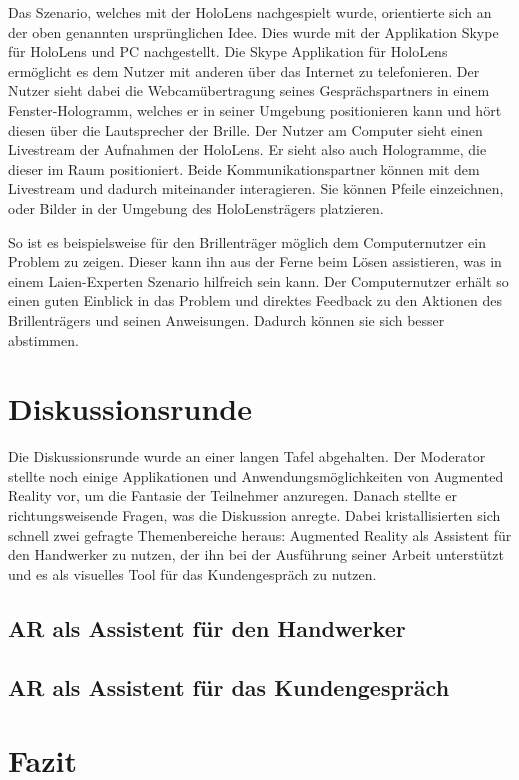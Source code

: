 Das Szenario, welches mit der HoloLens nachgespielt wurde, orientierte sich an der oben genannten ursprünglichen Idee. Dies wurde mit der Applikation Skype für HoloLens und PC nachgestellt. Die Skype Applikation für HoloLens ermöglicht es dem Nutzer mit anderen über das Internet zu telefonieren. Der Nutzer sieht dabei die Webcamübertragung seines Gesprächspartners in einem Fenster-Hologramm, welches er in seiner Umgebung positionieren kann und hört diesen über die Lautsprecher der Brille. Der Nutzer am Computer sieht einen Livestream der Aufnahmen der HoloLens. Er sieht also auch Hologramme, die dieser im Raum positioniert. Beide Kommunikationspartner können mit dem Livestream und dadurch miteinander interagieren. Sie können Pfeile einzeichnen, oder Bilder in der Umgebung des HoloLensträgers platzieren. 

So ist es beispielsweise für den Brillenträger möglich dem Computernutzer ein Problem zu zeigen. Dieser kann ihn aus der Ferne beim Lösen assistieren, was in einem Laien-Experten Szenario hilfreich sein kann. Der Computernutzer erhält so einen guten Einblick in das Problem und direktes Feedback zu den Aktionen des Brillenträgers und seinen Anweisungen. Dadurch können sie sich besser abstimmen.

\section{Diskussionsrunde}

Die Diskussionsrunde wurde an einer langen Tafel abgehalten. Der Moderator stellte noch einige Applikationen und Anwendungsmöglichkeiten von Augmented Reality vor, um die Fantasie der Teilnehmer anzuregen. Danach stellte er richtungsweisende Fragen, was die Diskussion anregte. Dabei kristallisierten sich schnell zwei gefragte Themenbereiche heraus: Augmented Reality als Assistent für den Handwerker zu nutzen, der ihn bei der Ausführung seiner Arbeit unterstützt und es als visuelles Tool für das Kundengespräch zu nutzen.

\subsection{AR als Assistent für den Handwerker}

\subsection{AR als Assistent für das Kundengespräch}

\section{Fazit}